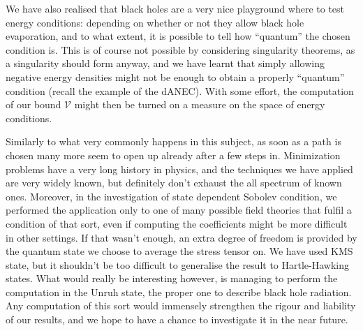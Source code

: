 We have also realised that black holes are a very nice playground where to test energy conditions: depending on whether or not they allow black hole evaporation, and to what extent, it is possible to tell how ``quantum'' the chosen condition is. This is of course not possible by considering singularity theorems, as a singularity should form anyway, and we have learnt that simply allowing negative energy densities might not be enough to obtain a properly ``quantum'' condition (recall the example of the dANEC). With some effort, the computation of our bound \(\mathcal{V}\) might then be turned on a measure on the space of energy conditions.

Similarly to what very commonly happens in this subject, as soon as a path is chosen many more seem to open up already after a few steps in.
Minimization problems have a very long history in physics, and the techniques we have applied are very widely known, but definitely don't exhaust the all spectrum of known ones.
Moreover, in the investigation of state dependent Sobolev condition, we performed the application only to one of many possible field theories that fulfil a condition of that sort, even if computing the coefficients might be more difficult in other settings.
If that wasn't enough, an extra degree of freedom is provided by the quantum state we choose to average the stress tensor on. We have used KMS state, but it shouldn't be too difficult to generalise the result to Hartle-Hawking states.
What would really be interesting however, is managing to perform the computation in the Unruh state, the proper one to describe black hole radiation. Any computation of this sort would immensely strengthen the rigour and liability of our results, and we hope to have a chance to investigate it in the near future.

